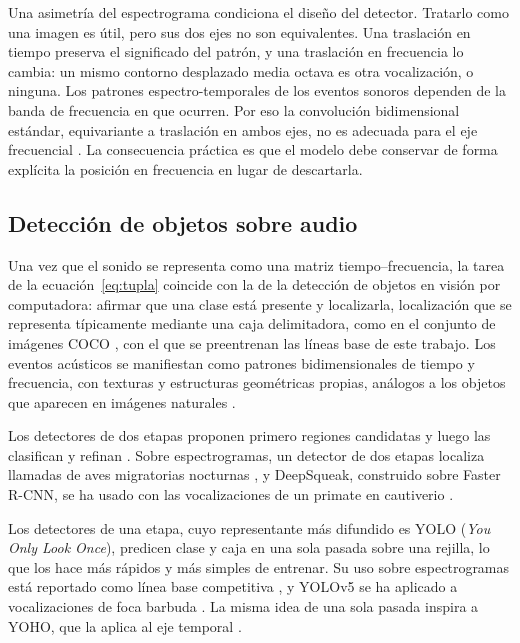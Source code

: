 Una asimetría del espectrograma condiciona el diseño del detector. Tratarlo como
una imagen es útil, pero sus dos ejes no son equivalentes. Una traslación en
tiempo preserva el significado del patrón, y una traslación en frecuencia lo
cambia: un mismo contorno desplazado media octava es otra vocalización, o
ninguna. Los patrones espectro-temporales de los eventos sonoros dependen de la
banda de frecuencia en que ocurren. Por eso la convolución bidimensional
estándar, equivariante a traslación en ambos ejes, no es adecuada para el eje
frecuencial \citep{nam_frequency_2022}. La consecuencia práctica es que el modelo
debe conservar de forma explícita la posición en frecuencia en lugar de
descartarla.

\subsection{Detección de objetos sobre audio}
\label{sec:objetos}

Una vez que el sonido se representa como una matriz tiempo--frecuencia, la tarea
de la ecuación~\eqref{eq:tupla} coincide con la de la detección de objetos en
visión por computadora: afirmar que una clase está presente y localizarla,
localización que se representa típicamente mediante una caja delimitadora, como
en el conjunto de imágenes COCO \citep{lin_2014}, con el que se preentrenan las
líneas base de este trabajo. Los eventos acústicos se
manifiestan como patrones bidimensionales de tiempo y frecuencia, con texturas y
estructuras geométricas propias, análogos a los objetos que aparecen en imágenes
naturales \citep{pham_eventness_2018}.

 Los detectores de dos etapas proponen primero regiones
candidatas y luego las clasifican y refinan \citep{ren_faster_2017}. Sobre espectrogramas, un detector de
dos etapas localiza llamadas de aves migratorias nocturnas \citep{airale_nbm_2025},
y DeepSqueak, construido sobre Faster R-CNN, se ha usado con las vocalizaciones de
un primate en cautiverio \citep{romero-mujalli_utilizing_2021}.

 Los detectores de una etapa, cuyo representante más
difundido es YOLO (\textit{You Only Look Once}), predicen clase y caja en una
sola pasada sobre una rejilla, lo que los hace más rápidos y más simples de
entrenar. Su uso sobre espectrogramas está reportado como línea base competitiva
\citep{gonzalez_yolo-based_2025}, y YOLOv5 se ha aplicado a vocalizaciones de
foca barbuda \citep{escobar-amado_computer_2024}. La misma idea de una sola
pasada inspira a YOHO, que la aplica al eje temporal \citep{venkatesh_you_2022}.


